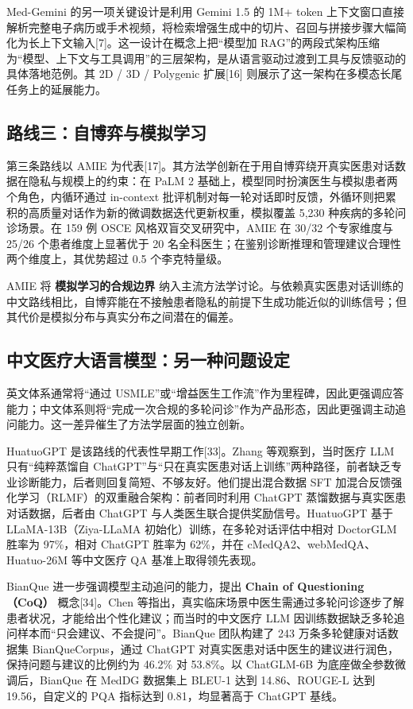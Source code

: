 Med-Gemini 的另一项关键设计是利用 Gemini 1.5 的 1M+ token 上下文窗口直接解析完整电子病历或手术视频，将检索增强生成中的切片、召回与拼接步骤大幅简化为长上下文输入[7]。这一设计在概念上把“模型加 RAG”的两段式架构压缩为“模型、上下文与工具调用”的三层架构，是从语言驱动过渡到工具与反馈驱动的具体落地范例。其 2D / 3D / Polygenic 扩展[16] 则展示了这一架构在多模态长尾任务上的延展能力。

\subsection{路线三：自博弈与模拟学习}

第三条路线以 AMIE 为代表[17]。其方法学创新在于用自博弈绕开真实医患对话数据在隐私与规模上的约束：在 PaLM 2 基础上，模型同时扮演医生与模拟患者两个角色，内循环通过 in-context 批评机制对每一轮对话即时反馈，外循环则把累积的高质量对话作为新的微调数据迭代更新权重，模拟覆盖 5,230 种疾病的多轮问诊场景。在 159 例 OSCE 风格双盲交叉研究中，AMIE 在 30/32 个专家维度与 25/26 个患者维度上显著优于 20 名全科医生；在鉴别诊断推理和管理建议合理性两个维度上，其优势超过 0.5 个李克特量级。

AMIE 将 \textbf{模拟学习的合规边界} 纳入主流方法学讨论。与依赖真实医患对话训练的中文路线相比，自博弈能在不接触患者隐私的前提下生成功能近似的训练信号；但其代价是模拟分布与真实分布之间潜在的偏差。

\subsection{中文医疗大语言模型：另一种问题设定}

英文体系通常将“通过 USMLE”或“增益医生工作流”作为里程碑，因此更强调应答能力；中文体系则将“完成一次合规的多轮问诊”作为产品形态，因此更强调主动追问能力。这一差异催生了方法学层面的独立创新。

HuatuoGPT 是该路线的代表性早期工作[33]。Zhang 等观察到，当时医疗 LLM 只有“纯粹蒸馏自 ChatGPT”与“只在真实医患对话上训练”两种路径，前者缺乏专业诊断能力，后者则回复简短、不够友好。他们提出混合数据 SFT 加混合反馈强化学习（RLMF）的双重融合架构：前者同时利用 ChatGPT 蒸馏数据与真实医患对话数据，后者由 ChatGPT 与人类医生联合提供奖励信号。HuatuoGPT 基于 LLaMA-13B（Ziya-LLaMA 初始化）训练，在多轮对话评估中相对 DoctorGLM 胜率为 97\%，相对 ChatGPT 胜率为 62\%，并在 cMedQA2、webMedQA、Huatuo-26M 等中文医疗 QA 基准上取得领先表现。

BianQue 进一步强调模型主动追问的能力，提出 \textbf{Chain of Questioning（CoQ）} 概念[34]。Chen 等指出，真实临床场景中医生需通过多轮问诊逐步了解患者状况，才能给出个性化建议；而当时的中文医疗 LLM 因训练数据缺乏多轮追问样本而“只会建议、不会提问”。BianQue 团队构建了 243 万条多轮健康对话数据集 BianQueCorpus，通过 ChatGPT 对真实医患对话中医生的建议进行润色，保持问题与建议的比例约为 46.2\% 对 53.8\%。以 ChatGLM-6B 为底座做全参数微调后，BianQue 在 MedDG 数据集上 BLEU-1 达到 14.86、ROUGE-L 达到 19.56，自定义的 PQA 指标达到 0.81，均显著高于 ChatGPT 基线。

